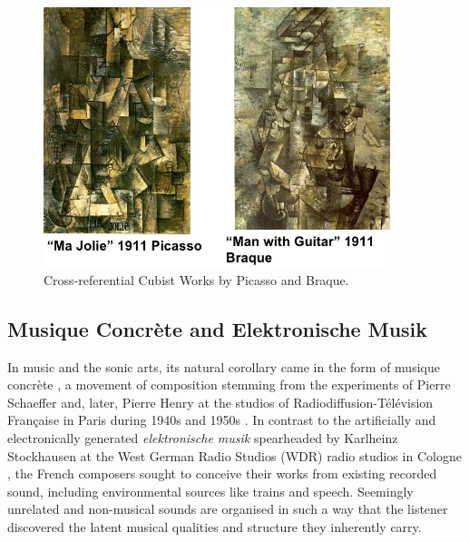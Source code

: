 \begin{figure}
	\begin{center}
		\includegraphics[width=0.9\textwidth]{ch04_sota/figures/picasso.png}
	\end{center}
	\caption[Cross-referential Cubist Works by Picasso and Braque]{Cross-referential Cubist Works by Picasso and Braque.}
	\label{fig:picasso}
\end{figure}
\subsection{Musique Concrète and Elektronische Musik}

In music and the sonic arts, its natural corollary came in the form of musique concrète \citep{Holmes2008}, a movement of composition stemming from the experiments of Pierre Schaeffer and, later, Pierre Henry at the studios of Radiodiffusion-Télévision Française in Paris during 1940s and 1950s \citep{Battier2007a} . In contrast to the artificially and electronically generated \textit{elektronische musik} spearheaded by Karlheinz Stockhausen at the West German Radio Studios (WDR) radio studios in Cologne \citep{Collins2011a, Bates2009}, the French composers sought to conceive their works from existing recorded sound, including environmental sources like trains and speech. Seemingly unrelated and non-musical sounds are organised in such a way that the listener discovered the latent musical qualities and structure they inherently carry.

